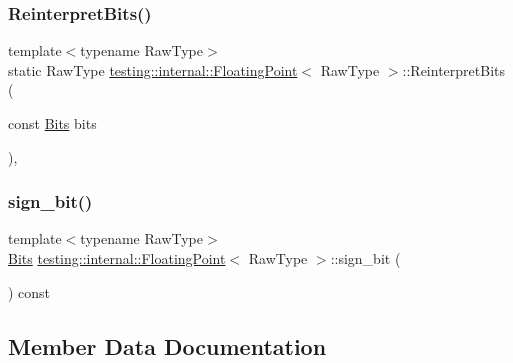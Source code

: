 \subsubsection{\texorpdfstring{ReinterpretBits()}{ReinterpretBits()}}
{\footnotesize\ttfamily template$<$typename Raw\+Type$>$ \\
static Raw\+Type \mbox{\hyperlink{classtesting_1_1internal_1_1FloatingPoint}{testing\+::internal\+::\+Floating\+Point}}$<$ Raw\+Type $>$\+::Reinterpret\+Bits (\begin{DoxyParamCaption}\item[{const \mbox{\hyperlink{classtesting_1_1internal_1_1FloatingPoint_abf228bf6cd48f12c8b44c85b4971a731}{Bits}}}]{bits }\end{DoxyParamCaption})\hspace{0.3cm}{\ttfamily [inline]}, {\ttfamily [static]}}

\mbox{\label{classtesting_1_1internal_1_1FloatingPoint_afb8a816bb598225d775caaf43a893ef0}} 
\subsubsection{\texorpdfstring{sign\_bit()}{sign\_bit()}}
{\footnotesize\ttfamily template$<$typename Raw\+Type$>$ \\
\mbox{\hyperlink{classtesting_1_1internal_1_1FloatingPoint_abf228bf6cd48f12c8b44c85b4971a731}{Bits}} \mbox{\hyperlink{classtesting_1_1internal_1_1FloatingPoint}{testing\+::internal\+::\+Floating\+Point}}$<$ Raw\+Type $>$\+::sign\+\_\+bit (\begin{DoxyParamCaption}{ }\end{DoxyParamCaption}) const\hspace{0.3cm}{\ttfamily [inline]}}



\subsection{Member Data Documentation}
\mbox{\label{classtesting_1_1internal_1_1FloatingPoint_ab819d2e8f93e9e482373999f0f8d71b9}} 
